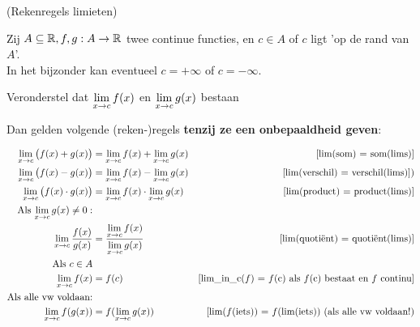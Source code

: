 \documentclass{ximera}
\begin{document}
\begin{proposition} (Rekenregels limieten)
	
	Zij $A\subseteq\mathbb{R}, f,g:A\to\mathbb{R}$ twee continue functies, en $c\in A$ of $c$ ligt 'op de rand van $A$'. \\
	In het bijzonder kan eventueel $c=+\infty$ of $c=-\infty$. 
	
	Veronderstel dat $\limxc f(x)$ en $\limxc g(x)$ bestaan%
	
	Dan gelden volgende (reken-)regels  \textbf{\color{red} tenzij ze een {\large onbepaaldheid} geven}: 
	
	
	\begin{align}
		 \limxc \big(f(x) +g(x)\big) & = \limxc f(x) + \limxc g(x)  
		     & \text{[lim(som) = som(lims)]} \label{elim-som} \\
		 \limxc \big(f(x) -g(x)\big) & = \limxc f(x) - \limxc g(x)  
		     & \text{[lim(verschil) = verschil(lims)])} \label{elim-verschil}\\
		 \limxc \big(f(x)\cdot g(x)\big) & = \limxc f(x) \cdot \limxc g(x)  
		     & \text{[lim(product) =  product(lims)]} \label{elim-product} \\
		 \mbox{Als $\limxc g(x) \neq 0:$} \notag\\
		 \limxc \dfrac{f(x)}{g(x)} & = \dfrac{\limxc f(x)}{\limxc g(x)}  
		     & \text{[lim(quotiënt) = quotiënt(lims)]} \label{elim-quotient} \\
		 \mbox{Als $c\in A$} \notag\\ %
		 \limxc f(x) & = f(c) 
		     & \text{[lim\_in\_c($f$) = $f$(c) als $f$(c) bestaat en $f$ continu]} \label{elim-domein} \\
		 \text{Als alle vw voldaan:} \notag \\ %
		 \limxc f(g(x)) & = f(\limxc g(x)) 
		     & \text{[lim($f$(iets)) =  $f$(lim(iets)) (als alle vw voldaan!)} \label{elim-continu} 
	\end{align}
\end{proposition}
\end{document}
